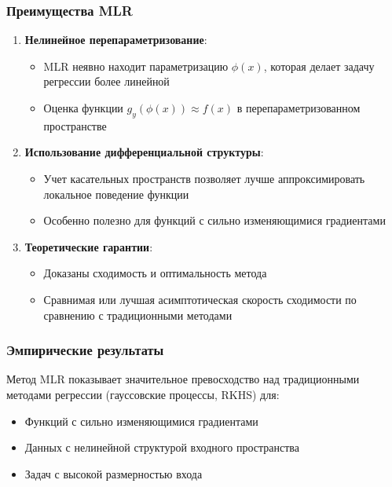\documentclass[a4paper,12pt]{article}
\begin{document}
\subsubsection{Преимущества MLR}

\begin{enumerate}
    \item \textbf{Нелинейное перепараметризование}:
    \begin{itemize}
        \item MLR неявно находит параметризацию $\phi(x)$, которая делает задачу регрессии более линейной
        \item Оценка функции $g_y(\phi(x)) \approx f(x)$ в перепараметризованном пространстве
    \end{itemize}

    \item \textbf{Использование дифференциальной структуры}:
    \begin{itemize}
        \item Учет касательных пространств позволяет лучше аппроксимировать локальное поведение функции
        \item Особенно полезно для функций с сильно изменяющимися градиентами
    \end{itemize}

    \item \textbf{Теоретические гарантии}:
    \begin{itemize}
        \item Доказаны сходимость и оптимальность метода
        \item Сравнимая или лучшая асимптотическая скорость сходимости по сравнению с традиционными методами
    \end{itemize}
\end{enumerate}

\subsubsection{Эмпирические результаты}

Метод MLR показывает значительное превосходство над традиционными методами регрессии (гауссовские процессы, RKHS) для:
\begin{itemize}
    \item Функций с сильно изменяющимися градиентами
    \item Данных с нелинейной структурой входного пространства
    \item Задач с высокой размерностью входа
\end{itemize}
\end{document}
